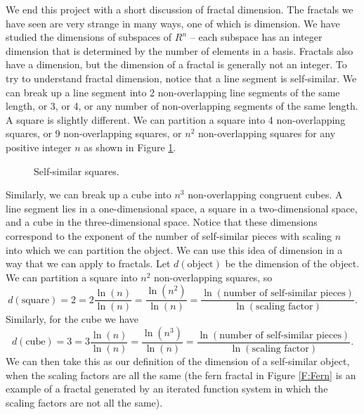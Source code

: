 We end this project with a short discussion of fractal dimension. The fractals we have seen are very strange in many ways, one of which is dimension. We have studied the dimensions of subspaces of $R^n$ -- each subspace has an integer dimension that is determined by the number of elements in a basis. Fractals also have a dimension, but the dimension of a fractal is generally not an integer. To try to understand fractal dimension, notice that a line segment is self-similar. We can break up a line segment into 2 non-overlapping line segments of the same length, or 3, or 4, or any number of non-overlapping segments of the same length. A square is slightly different. We can partition a square into 4 non-overlapping squares, or 9 non-overlapping squares, or $n^2$ non-overlapping squares for any positive integer $n$ as shown in Figure \ref{F:Squares}.
\begin{figure}[h]
\begin{center}
\caption{Self-similar squares.}
\label{F:Squares}
\end{center}
\end{figure}
Similarly, we can break up a cube into $n^3$ non-overlapping congruent cubes. A line segment lies in a one-dimensional space, a square in a two-dimensional space, and a cube in the three-dimensional space. Notice that these dimensions correspond to the exponent of the number of self-similar pieces with scaling $n$ into which we can partition the object. We can use this idea of dimension in a way that we can apply to fractals. Let $d(\text{object})$ be the dimension of the object. We can partition a square into $n^2$ non-overlapping squares, so 
\[d(\text{square}) = 2 = 2\frac{\ln(n)}{\ln(n)} = \frac{\ln(n^2)}{\ln(n)} = \frac{\ln(\text{number of self-similar pieces})}{\ln(\text{scaling factor})}.\]
Similarly, for the cube we have 
\[d(\text{cube}) = 3 = 3\frac{\ln(n)}{\ln(n)} = \frac{\ln(n^3)}{\ln(n)} = \frac{\ln(\text{number of self-similar pieces})}{\ln(\text{scaling factor})}.\]
We can then take this as our definition of the dimension of a self-similar object, when the scaling factors are all the same (the fern fractal in Figure \ref{F:Fern} is an example of a fractal generated by an iterated function system in which the scaling factors are not all the same).

